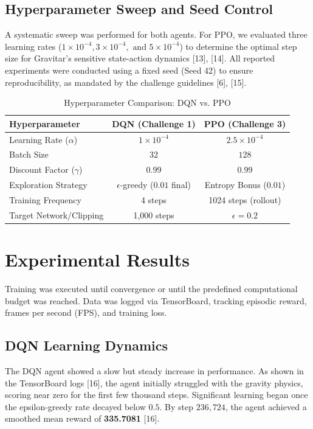 \documentclass[conference]{IEEEtran}
\begin{document}
\subsection{Hyperparameter Sweep and Seed Control}
A systematic sweep was performed for both agents.
For PPO, we evaluated three learning rates ($1 \times 10^{-4}, 3 \times 10^{-4}, \text{ and } 5 \times 10^{-4}$) to determine the optimal step size for Gravitar's sensitive state-action dynamics [13], [14].
All reported experiments were conducted using a fixed seed (Seed 42) to ensure reproducibility, as mandated by the challenge guidelines [6], [15].

\begin{table}[htbp]
\caption{Hyperparameter Comparison: DQN vs. PPO}
\begin{center}
\begin{tabular}{|l|c|c|}
\hline
\textbf{Hyperparameter} & \textbf{DQN (Challenge 1)} & \textbf{PPO (Challenge 3)} \\
\hline
Learning Rate ($\alpha$) & $1 \times 10^{-4}$ & $2.5 \times 10^{-4}$ \\
\hline
Batch Size & $32$ & $128$ \\
\hline
Discount Factor ($\gamma$) & $0.99$ & $0.99$ \\
\hline
Exploration Strategy & $\epsilon$-greedy ($0.01$ final) & Entropy Bonus ($0.01$) \\
\hline
Training Frequency & 4 steps & 1024 steps (rollout) \\
\hline
Target Network/Clipping & 1,000 steps & $\epsilon = 0.2$ \\
\hline
\end{tabular}
\label{tab1}
\end{center}
\end{table}

\section{Experimental Results}
Training was executed until convergence or until the predefined computational budget was reached.
Data was logged via TensorBoard, tracking episodic reward, frames per second (FPS), and training loss.

\subsection{DQN Learning Dynamics}
The DQN agent showed a slow but steady increase in performance.
As shown in the TensorBoard logs [16], the agent initially struggled with the gravity physics, scoring near zero for the first few thousand steps.
Significant learning began once the epsilon-greedy rate decayed below $0.5$.
By step $236,724$, the agent achieved a smoothed mean reward of \textbf{335.7081} [16].
\end{document}

